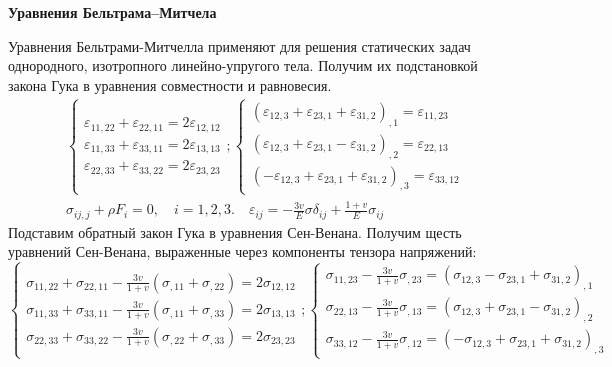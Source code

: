 \textbf{Уравнения Бельтрама--Митчела}


Уравнения Бельтрами-Митчелла применяют для решения статических задач однородного, изотропного линейно-упругого тела. Получим их подстановкой закона Гука в уравнения совместности и равновесия.
$$
\begin{aligned}
&\left\{\begin{array}{l}
\varepsilon_{11,22}+\varepsilon_{22,11}=2 \varepsilon_{12,12} \\
\varepsilon_{11,33}+\varepsilon_{33,11}=2 \varepsilon_{13,13} \\
\varepsilon_{22,33}+\varepsilon_{33,22}=2 \varepsilon_{23,23}
\end{array} ;\left\{\begin{array}{l}
\left(\varepsilon_{12,3}+\varepsilon_{23,1}+\varepsilon_{31,2}\right)_{, 1}=\varepsilon_{11,23} \\\left(\varepsilon_{12,3}+\varepsilon_{23,1}-\varepsilon_{31,2}\right)_{, 2}=\varepsilon_{22,13} \\
\left(-\varepsilon_{12,3}+\varepsilon_{23,1}+\varepsilon_{31,2}\right)_{, 3}=\varepsilon_{33,12}
\end{array}\right.\right. \\
& \sigma_{i j, j}+\rho F_i=0,\quad i=1,2,3.\quad \varepsilon_{i j}=-\frac{3 v}{E} \sigma \delta_{i j}+\frac{1+v}{E} \sigma_{i j} 
\end{aligned}
$$
Подставим обратный закон Гука в уравнения Сен-Венана. Получим щесть уравнений Сен-Венана, выраженные через компоненты тензора напряжений:
$$
\left\{\begin{array}{l}
\sigma_{11,22}+\sigma_{22,11}-\frac{3 v}{1+v}\left(\sigma_{, 11}+\sigma_{, 22}\right)=2 \sigma_{12,12} \\
\sigma_{11,33}+\sigma_{33,11}-\frac{3 v}{1+v}\left(\sigma_{, 11}+\sigma_{, 33}\right)=2 \sigma_{13,13} \\
\sigma_{22,33}+\sigma_{33,22}-\frac{3 v}{1+v}\left(\sigma_{, 22}+\sigma_{, 33}\right)=2 \sigma_{23,23}
\end{array} ; \begin{cases}\sigma_{11,23}-\frac{3 v}{1+v} \sigma_{, 23}=\left(\sigma_{12,3}-\sigma_{23,1}+\sigma_{31,2}\right)_{, 1} & \\
\sigma_{22,13}-\frac{3 v}{1+v} \sigma_{, 13}=\left(\sigma_{12,3}+\sigma_{23,1}-\sigma_{31,2}\right)_{, 2} &  \\
\sigma_{33,12}-\frac{3 v}{1+v} \sigma_{, 12}=\left(-\sigma_{12,3}+\sigma_{23,1}+\sigma_{31,2}\right)_{, 3} & \end{cases}\right.
$$


